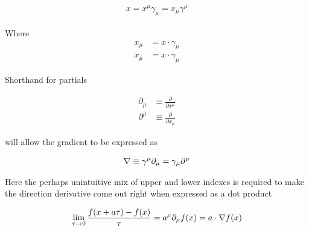\begin{align}\label{eqn:rotationGen:foo5}
x = x^\mu \gamma_\mu = x_\mu \gamma^\mu
\end{align}

Where
\begin{align}\label{eqn:rotationGen:foo6}
x_\mu &= x \cdot \gamma_\mu \\
x_\mu &= x \cdot \gamma_\mu
\end{align}

Shorthand for partials

\begin{align}\label{eqn:rotationGen:foo7}
\partial_\mu &\equiv \frac{\partial}{\partial x^\mu} \\
\partial^\mu &\equiv \frac{\partial}{\partial x_\mu}
\end{align}

will allow the gradient to be expressed as 

\begin{align}\label{eqn:rotationGen:foo8}
\nabla \equiv \gamma^\mu \partial_\mu = \gamma_\mu \partial^\mu
\end{align}

Here the perhaps unintuitive mix of upper and lower indexes is required to make the direction derivative come out right when expressed as a dot product

\begin{align}\label{eqn:rotationGen:foo9}
\lim_{\tau \rightarrow 0} \frac{f(x + a\tau) - f(x)}{\tau} = a^\mu \partial_\mu f(x) = a \cdot \nabla f(x)
\end{align}

\EndArticle
